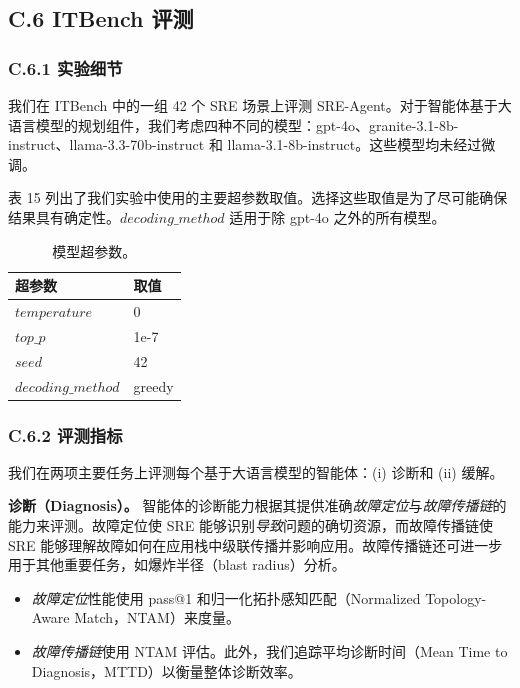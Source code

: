 \subsection{C.6 ITBench 评测}

\subsubsection{C.6.1 实验细节}

我们在 ITBench 中的一组 42 个 SRE 场景上评测 SRE-Agent。对于智能体基于大语言模型的规划组件，我们考虑四种不同的模型：gpt-4o、granite-3.1-8b-instruct、llama-3.3-70b-instruct 和 llama-3.1-8b-instruct。这些模型均未经过微调。

表 15 列出了我们实验中使用的主要超参数取值。选择这些取值是为了尽可能确保结果具有确定性。$decoding\_method$ 适用于除 gpt-4o 之外的所有模型。

\begin{table}[H]
\centering
\caption{模型超参数。}
\label{tab:itb-tab15}
\begin{tabular}{ll}
\toprule
\textbf{超参数} & \textbf{取值} \\
\midrule
$temperature$ & 0 \\
$top\_p$ & 1e-7 \\
$seed$ & 42 \\
$decoding\_method$ & greedy \\
\bottomrule
\end{tabular}
\end{table}

\subsubsection{C.6.2 评测指标}

我们在两项主要任务上评测每个基于大语言模型的智能体：(i) 诊断和 (ii) 缓解。

\textbf{诊断（Diagnosis）。} 智能体的诊断能力根据其提供准确\emph{故障定位}与\emph{故障传播链}的能力来评测。故障定位使 SRE 能够识别\emph{导致}问题的确切资源，而故障传播链使 SRE 能够理解故障如何在应用栈中级联传播并影响应用。故障传播链还可进一步用于其他重要任务，如爆炸半径（blast radius）分析。

\begin{itemize}
\item \emph{故障定位}性能使用 pass@1 和归一化拓扑感知匹配（Normalized Topology-Aware Match，NTAM）来度量。
\item \emph{故障传播链}使用 NTAM 评估。此外，我们追踪平均诊断时间（Mean Time to Diagnosis，MTTD）以衡量整体诊断效率。
\end{itemize}

